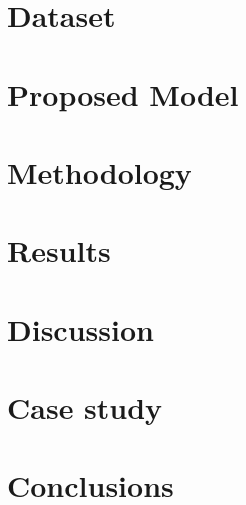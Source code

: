 \documentclass[pdftex]{pucthesis}	%
\begin{document}
\chapter[DATASET]{Dataset} \label{dataset}


\chapter[PROPOSED MODEL]{Proposed Model} \label{arch}


\chapter[METHODOLOGY]{Methodology} \label{methodology}


\chapter[RESULTS]{Results} \label{results}


\chapter[DISCUSSION]{Discussion} \label{discussion}


\chapter[CASE STUDY]{Case study} \label{case_study}


\chapter[CONCLUSIONS]{Conclusions} \label{conclusions}



\cleardoublepage
{} \label{references}

\renewcommand{\bibname}{REFERENCES}





\end{document}
